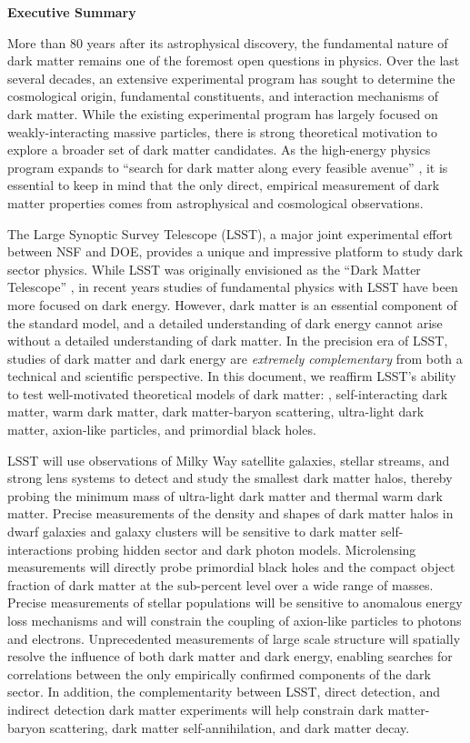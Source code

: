 \begin{center}
  {\Large \bf Executive Summary}
\end{center}

More than 80 years after its astrophysical discovery, the fundamental nature of dark matter remains one of the foremost open questions in physics.
Over the last several decades, an extensive experimental program has sought to determine the cosmological origin, fundamental constituents, and interaction mechanisms of dark matter. 
While the existing experimental program has largely focused on weakly-interacting massive particles, there is strong theoretical motivation to explore a broader set of dark matter candidates.
As the high-energy physics program expands to ``search for dark matter along every feasible avenue'' \citep{P5Report}, it is essential to keep in mind that the only direct, empirical measurement of dark matter properties comes from astrophysical and cosmological observations.

The Large Synoptic Survey Telescope (LSST), a major joint experimental effort between NSF and DOE, provides a unique and impressive platform to study dark sector physics.
While LSST was originally envisioned as the ``Dark Matter Telescope'' \citep{Tyson:2001}, in recent years studies of fundamental physics with LSST have been more focused on dark energy.
However, dark matter is an essential component of the standard \LCDM model, and a detailed understanding of dark energy cannot arise without a detailed understanding of dark matter.
In the precision era of LSST, studies of dark matter and dark energy are \emph{extremely complementary} from both a technical and scientific perspective.
In this document, we reaffirm LSST's ability to test well-motivated theoretical models of dark matter: \ie, self-interacting dark matter, warm dark matter, dark matter-baryon scattering, ultra-light dark matter, axion-like particles, and primordial black holes. 

LSST will use observations of Milky Way satellite galaxies, stellar streams, and strong lens systems to detect and study the smallest dark matter halos, thereby probing the minimum mass of ultra-light dark matter and thermal warm dark matter.
Precise measurements of the density and shapes of dark matter halos in dwarf galaxies and galaxy clusters will be sensitive to dark matter self-interactions probing hidden sector and dark photon models.
Microlensing measurements will directly probe primordial black holes and the compact object fraction of dark matter at the sub-percent level over a wide range of masses.
Precise measurements of stellar populations will be sensitive to anomalous energy loss mechanisms and will constrain the coupling of axion-like particles to photons and electrons.
Unprecedented measurements of large scale structure will spatially resolve the influence of both dark matter and dark energy, enabling searches for correlations between the only empirically confirmed components of the dark sector.
In addition, the complementarity between LSST, direct detection, and indirect detection dark matter experiments will help constrain dark matter-baryon scattering, dark matter self-annihilation, and dark matter decay.

